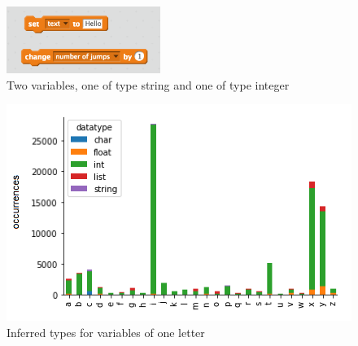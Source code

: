 \documentclass[conference]{IEEEtran}
\begin{document}
\begin{figure}
	\begin{center}
		\includegraphics[width=5cm]{fig/types}
		\caption{Two variables, one of type string and one of type integer}
		\label{fig:types}
	\end{center}
\end{figure} 
\begin{figure}
	\begin{center}
		\includegraphics[width=\columnwidth]{fig/singleletter_type_occurrences}
		\caption{Inferred types for variables of one letter}
		\label{fig:one_letter_type}
	\end{center}
\end{figure} 
\end{document}
